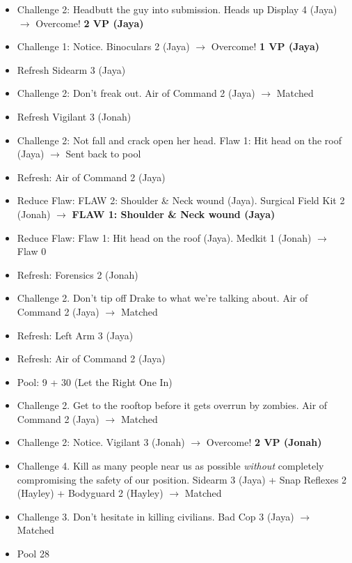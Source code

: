 \begin{itemize}
\item Challenge 2: Headbutt the guy into submission.  Heads up Display 4 (Jaya) $\rightarrow$ Overcome! \textbf{2 VP (Jaya)}
\item Challenge 1: Notice.  Binoculars 2 (Jaya) $\rightarrow$ Overcome! \textbf{1 VP (Jaya)}
\item Refresh Sidearm 3 (Jaya)
\item Challenge 2: Don't freak out. Air of Command 2 (Jaya) $\rightarrow$ Matched
\item Refresh Vigilant 3 (Jonah)
\item Challenge 2: Not fall and crack open her head.  Flaw 1: Hit head on the roof (Jaya)\textbf{ }$\rightarrow$ Sent back to pool
\item Refresh: Air of Command 2 (Jaya)
\item Reduce Flaw: FLAW 2: Shoulder \& Neck wound (Jaya). {\color[RGB]{255,0,0}  } Surgical Field Kit 2 (Jonah) $\rightarrow$ \textbf{ {\color[RGB]{255,0,0}FLAW 1: Shoulder \& Neck wound (Jaya)} }
\item Reduce Flaw: Flaw 1: Hit head on the roof (Jaya).  Medkit 1 (Jonah) $\rightarrow$ Flaw 0
\item Refresh: Forensics 2 (Jonah)
\item Challenge 2.  Don't tip off Drake to what we're talking about.  Air of Command 2 (Jaya) $\rightarrow$ Matched
\item Refresh: Left Arm 3 (Jaya)
\item Refresh: Air of Command 2 (Jaya)
\item Pool: 9 + 30 (Let the Right One In)
\item Challenge 2.  Get to the rooftop before it gets overrun by zombies.  Air of Command 2 (Jaya) $\rightarrow$ Matched
\item Challenge 2: Notice.  Vigilant 3 (Jonah) $\rightarrow$ Overcome! \textbf{2 VP (Jonah)}
\item Challenge 4. Kill as many people near us as possible \textit{without} completely compromising the safety of our position.  Sidearm 3 (Jaya) + Snap Reflexes 2 (Hayley) + Bodyguard 2 (Hayley) $\rightarrow$ Matched
\item Challenge 3.  Don't hesitate in killing civilians.  Bad Cop 3 (Jaya) $\rightarrow$ Matched
\item Pool 28
\end{itemize}





